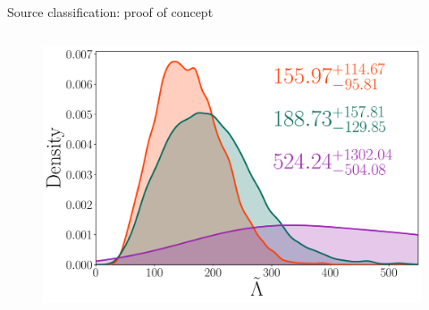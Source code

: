 \documentclass[usenames,dvipsnames,t]{beamer}
\begin{document}
\begin{frame}{Source classification: proof of concept}
\begin{columns}[T]
    \vspace{\y}

    \begin{figure}
      \centering
      \includegraphics[width=0.95\linewidth]{Figures/GW190425.pdf}
    \end{figure}
  \end{columns}
\end{frame}
\end{document}

